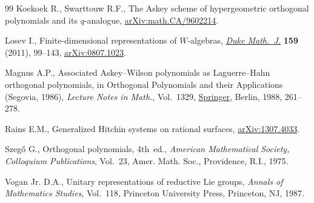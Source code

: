 \documentclass[10pt,a4paper]{amsart}
\theoremstyle{definition}
\numberwithin{equation}{section}
\begin{document}
\begin{thebibliography}{99}
Koekoek R., Swarttouw R.F., The {A}skey scheme of hypergeometric orthogonal
 polynomials and its $q$-analogue, \href{https://arxiv.org/abs/math.CA/9602214}{arXiv:math.CA/9602214}.

Losev I., Finite-dimensional representations of {$W$}-algebras, \href{https://doi.org/10.1215/00127094-1384800}{\textit{Duke
 Math.~J.}} \textbf{159} (2011), 99--143, \href{https://arxiv.org/abs/0807.1023}{arXiv:0807.1023}.

Magnus A.P., Associated {A}skey--{W}ilson polynomials as {L}aguerre--{H}ahn
 orthogonal polynomials, in Orthogonal Polynomials and their Applications
 ({S}egovia, 1986), \textit{Lecture Notes in Math.}, Vol.~1329, \href{https://doi.org/10.1007/BFb0083366}{Springer},
 Berlin, 1988, 261--278.

Rains E.M., Generalized {H}itchin systems on rational surfaces,
 \href{https://arxiv.org/abs/1307.4033}{arXiv:1307.4033}.

Szeg\H{o} G., Orthogonal polynomials, 4th~ed., \textit{American Mathematical Society,
 Colloquium Publications}, Vol.~23, Amer. Math. Soc., Providence,
 R.I., 1975.

Vogan Jr. D.A., Unitary representations of reductive {L}ie groups,
 \textit{Annals of Mathematics Studies}, Vol.~118, Princeton University Press,
 Princeton, NJ, 1987.

\end{thebibliography}
\end{document}
